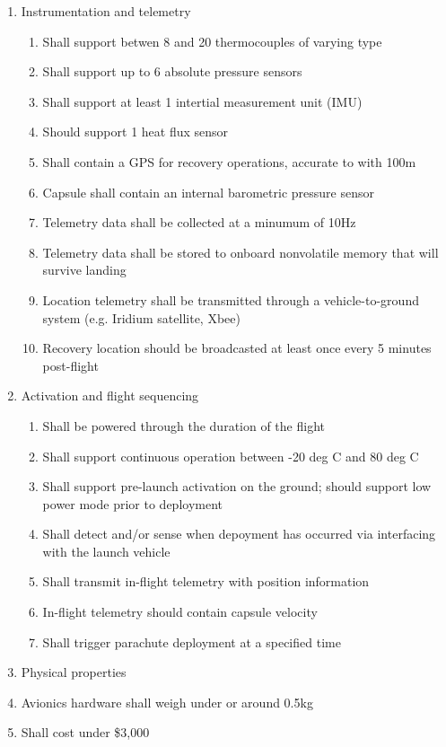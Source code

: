 \documentclass{article}
\begin{document}
\begin{enumerate}
\item Instrumentation and telemetry
  \begin{enumerate}
	  \item Shall support betwen 8 and 20 thermocouples of varying type
	  \item Shall support up to 6 absolute pressure sensors
	  \item Shall support at least 1 intertial measurement unit (IMU)
	  \item Should support 1 heat flux sensor
	  \item Shall contain a GPS for recovery operations, accurate to with 100m
	  \item Capsule shall contain an internal barometric pressure sensor 
	  \item Telemetry data shall be collected at a minumum of 10Hz
	  \item Telemetry data shall be stored to onboard nonvolatile memory that will survive landing
	  \item Location telemetry shall be transmitted through a vehicle-to-ground system (e.g. Iridium satellite, Xbee)
	  \item Recovery location should be broadcasted at least once every 5 minutes post-flight
  \end{enumerate}
\item Activation and flight sequencing
  \begin{enumerate}
	  \item Shall be powered through the duration of the flight
	  \item Shall support continuous operation between -20 deg C and 80 deg C
	  \item Shall support pre-launch activation on the ground; should support low power mode prior to deployment
	  \item Shall detect and/or sense when depoyment has occurred via interfacing with the launch vehicle
	  \item Shall transmit in-flight telemetry with position information
	  \item In-flight telemetry should contain capsule velocity 
	  \item Shall trigger parachute deployment at a specified time
  \end{enumerate}
\item Physical properties
\item Avionics hardware shall weigh under or around 0.5kg
\item Shall cost under \$3,000
\end{enumerate}
\end{document}
